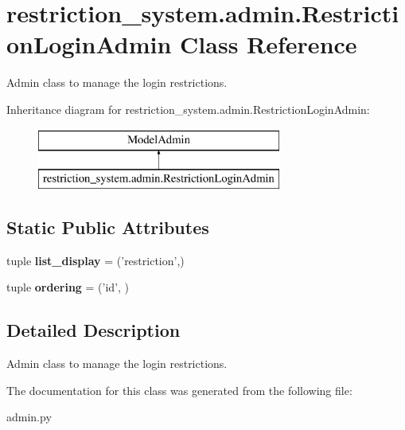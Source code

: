 \hypertarget{classrestriction__system_1_1admin_1_1RestrictionLoginAdmin}{}\section{restriction\+\_\+system.\+admin.\+Restriction\+Login\+Admin Class Reference}
\label{classrestriction__system_1_1admin_1_1RestrictionLoginAdmin}


Admin class to manage the login restrictions.  


Inheritance diagram for restriction\+\_\+system.\+admin.\+Restriction\+Login\+Admin\+:\begin{figure}[H]
\begin{center}
\leavevmode
\includegraphics[height=2.000000cm]{classrestriction__system_1_1admin_1_1RestrictionLoginAdmin}
\end{center}
\end{figure}
\subsection*{Static Public Attributes}
\begin{DoxyCompactItemize}
\item 
\hypertarget{classrestriction__system_1_1admin_1_1RestrictionLoginAdmin_af8e02020c6d6ca9ee00bcad785bf63c6}{}tuple {\bfseries list\+\_\+display} = ('restriction',)\label{classrestriction__system_1_1admin_1_1RestrictionLoginAdmin_af8e02020c6d6ca9ee00bcad785bf63c6}

\item 
\hypertarget{classrestriction__system_1_1admin_1_1RestrictionLoginAdmin_a6fd9c43c39e61f3c2a11e4a6ef5fa4a7}{}tuple {\bfseries ordering} = ('id', )\label{classrestriction__system_1_1admin_1_1RestrictionLoginAdmin_a6fd9c43c39e61f3c2a11e4a6ef5fa4a7}

\end{DoxyCompactItemize}


\subsection{Detailed Description}
Admin class to manage the login restrictions. 



The documentation for this class was generated from the following file\+:\begin{DoxyCompactItemize}
\item 
admin.\+py\end{DoxyCompactItemize}

